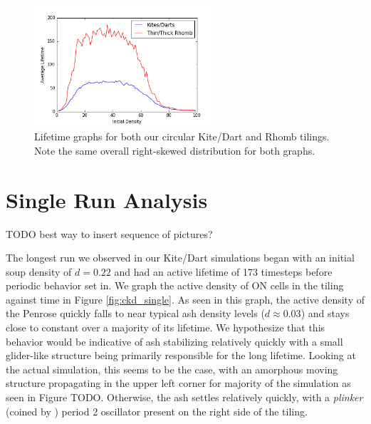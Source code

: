 \documentclass[a4paper,11pt]{report}
\begin{document}
\begin{figure}[htp]
\centering
\includegraphics[width=0.6\textwidth]{ch4_figs/both_lifetime}
\caption[Kite/Dart and Rhomb Lifetime Graph]{
	Lifetime graphs for both our circular Kite/Dart and Rhomb tilings. Note the same overall right-skewed distribution for both graphs.
}
\label{fig:both_lifetime}
\end{figure}


\section{Single Run Analysis}
\label{sec:ch4_single_run}
TODO best way to insert sequence of pictures?


The longest run we observed in our Kite/Dart simulations began with an initial soup density of $d=0.22$ and had an active lifetime of 173 timesteps before periodic behavior set in. We graph the active density of ON cells in the tiling against time in Figure \ref{fig:ckd_single}. As seen in this graph, the active density of the Penrose quickly falls to near typical ash density levels ($d \approx 0.03$) and stays close to constant over a majority of its lifetime. We hypothesize that this behavior would be indicative of ash stabilizing relatively quickly with a small glider-like structure being primarily responsible for the long lifetime. Looking at the actual simulation, this seems to be the case, with an amorphous moving structure propagating in the upper left corner for majority of the simulation as seen in Figure TODO. Otherwise, the ash settles relatively quickly, with a \textit{plinker} (coined by \citeauthor{hi05}) period 2 oscillator present on the right side of the tiling.
\end{document}
